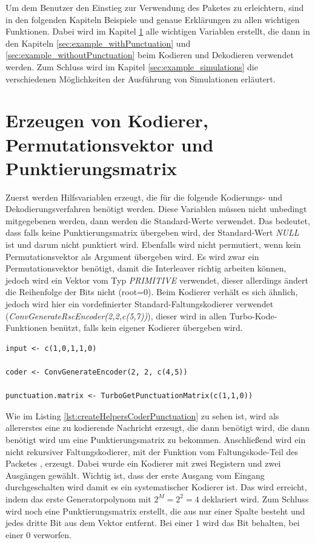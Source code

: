 Um dem Benutzer den Einstieg zur Verwendung des Paketes zu erleichtern, sind in den folgenden Kapiteln Beispiele und genaue Erklärungen zu allen wichtigen Funktionen. Dabei wird im Kapitel \ref{sec:example_createHelpers} alle wichtigen Variablen erstellt, die dann in den Kapiteln \ref{sec:example_withPunctuation} und \ref{sec:example_withoutPunctuation} beim Kodieren und Dekodieren verwendet werden. Zum Schluss wird im Kapitel \ref{sec:example_simulations} die verschiedenen Möglichkeiten der Ausführung von Simulationen erläutert.

\section{Erzeugen von Kodierer, Permutationsvektor und Punktierungsmatrix}
\label{sec:example_createHelpers}
Zuerst werden Hilfsvariablen erzeugt, die für die folgende Kodierungs- und Dekodierungsverfahren benötigt werden. Diese Variablen müssen nicht unbedingt mitgegebenen werden, dann werden die Standard-Werte verwendet. Das bedeutet, dass falls keine Punktierungsmatrix übergeben wird, der Standard-Wert \emph{NULL} ist und darum nicht punktiert wird. Ebenfalls wird nicht permutiert, wenn kein Permutationsvektor als Argument übergeben wird. Es wird zwar ein Permutationsvektor benötigt, damit die Interleaver richtig arbeiten können, jedoch wird ein Vektor vom Typ \emph{PRIMITIVE} verwendet, dieser allerdings ändert die Reihenfolge der Bits nicht (root=0). Beim Kodierer verhält es sich ähnlich, jedoch wird hier ein vordefinierter Standard-Faltungskodierer verwendet (\emph{ConvGenerateRscEncoder(2,2,c(5,7))}), dieser wird in allen Turbo-Kode-Funktionen benützt, falls kein eigener Kodierer übergeben wird.

\begin{lstlisting}[caption=Erzeugung von Kodierer und Punktierungsmatrix, label={lst:createHelpersCoderPunctuation}, float=!ht]
input <- c(1,0,1,1,0)

coder <- ConvGenerateEncoder(2, 2, c(4,5))

punctuation.matrix <- TurboGetPunctuationMatrix(c(1,1,0))
\end{lstlisting}

Wie im Listing \ref{lst:createHelpersCoderPunctuation} zu sehen ist, wird als allererstes eine zu kodierende Nachricht erzeugt, die dann benötigt wird, die dann benötigt wird um eine Punktierungsmatrix zu bekommen. Anschließend wird ein nicht rekursiver Faltungskodierer, mit der Funktion vom Faltungskode-Teil des Packetes \cite{nocker}, erzeugt. Dabei wurde ein Kodierer mit zwei Registern und zwei Ausgängen gewählt. Wichtig ist, dass der erste Ausgang vom Eingang durchgeschalten wird damit es ein systematischer Kodierer ist. Das wird erreicht, indem das erste Generatorpolynom mit $2^M = 2^2 = 4$ deklariert wird. Zum Schluss wird noch eine Punktierungsmatrix erstellt, die aus nur einer Spalte besteht und jedes dritte Bit aus dem Vektor entfernt. Bei einer 1 wird das Bit behalten, bei einer 0 verworfen.

